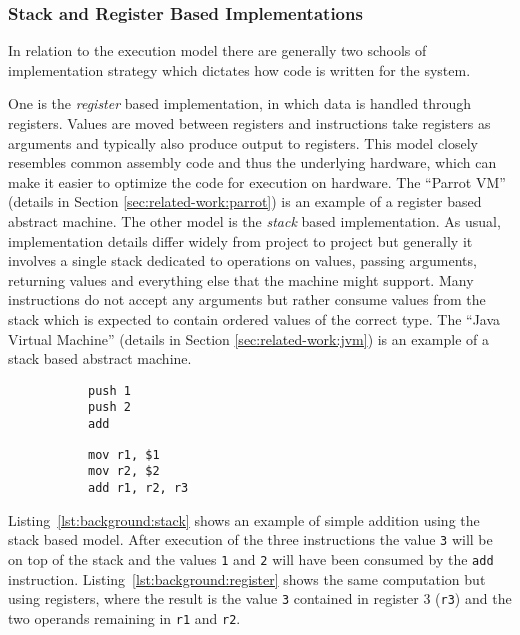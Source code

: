 \subsubsection{Stack and Register Based Implementations}
\label{sec:background:stack-vs-register}
In relation to the execution model there are generally two schools of
implementation strategy which dictates how code is written for the system.

One is the \textit{register} based implementation, in which data is handled
through registers. Values are moved between registers and instructions take
registers as arguments and typically also produce output to registers. This
model closely resembles common assembly code and thus the underlying hardware,
which can make it easier to optimize the code for execution on hardware. The
``Parrot VM'' (details in Section \ref{sec:related-work:parrot}) is an example
of a register based abstract machine. The other model is the \textit{stack}
based implementation. As usual, implementation details differ widely from
project to project but generally it involves a single stack dedicated to
operations on values, passing arguments, returning values and everything else
that the machine might support. Many instructions do not accept any arguments
but rather consume values from the stack which is expected to contain ordered
values of the correct type. The ``Java Virtual Machine'' (details in Section
\ref{sec:related-work:jvm}) is an example of a stack based abstract machine.

\begin{figure}[h]
  \centering
  \begin{subfigure}[t]{.45\textwidth}
    \begin{lstlisting}[label={lst:background:stack}, caption=Stack based addition]
push 1
push 2
add
    \end{lstlisting}
  \end{subfigure}
  \begin{subfigure}[t]{.45\textwidth}
    \begin{lstlisting}[label={lst:background:register}, caption=Register based addition]
mov r1, $1
mov r2, $2
add r1, r2, r3
    \end{lstlisting}
  \end{subfigure}
\end{figure}

Listing~\ref{lst:background:stack} shows an example of simple addition using the
stack based model. After execution of the three instructions the value
\texttt{3} will be on top of the stack and the values \texttt{1} and \texttt{2}
will have been consumed by the \texttt{add}
instruction. Listing~\ref{lst:background:register} shows the same computation
but using registers, where the result is the value \texttt{3} contained in
register 3 (\texttt{r3}) and the two operands remaining in \texttt{r1} and
\texttt{r2}.


